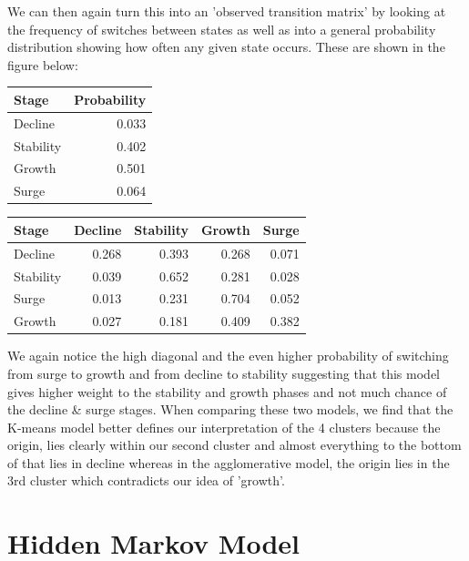 \documentclass[12pt]{article}
\begin{document}
\FloatBarrier
We can then again turn this into an 'observed transition matrix' by looking at the frequency of switches between states as well as into a general probability distribution showing how often any given state occurs. These are shown in the figure below:
\begin{center}
\begin{tabular}{lr}
\toprule
Stage  & Probability \\
\midrule
Decline &  0.033 \\
Stability &  0.402 \\
Growth &  0.501 \\
Surge &  0.064 \\
\bottomrule
\end{tabular}
\quad
\begin{tabular}{lrrrr}
\toprule
Stage & Decline &  Stability & Growth & Surge \\
\midrule
Decline   &  0.268 &  0.393 &  0.268 &  0.071 \\
Stability     &  0.039 &  0.652 &  0.281 &  0.028 \\
Surge     &  0.013 &  0.231 &  0.704 &  0.052 \\
Growth     &  0.027 &  0.181 &  0.409 &  0.382 \\
\bottomrule
\end{tabular}
\end{center}
\vspace{0.5cm}
We again notice the high diagonal and the even higher probability of switching from surge to growth and from decline to stability suggesting that this model gives higher weight to the stability and growth phases and not much chance of the decline \& surge stages.
When comparing these two models, we find that the K-means model better defines our interpretation of the 4 clusters because the origin, lies clearly within our second cluster and almost everything to the bottom of that lies in decline whereas in the agglomerative model, the origin lies in the 3rd cluster which contradicts our idea of 'growth'. 
\newpage
\section{Hidden Markov Model}
\end{document}

